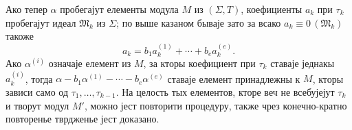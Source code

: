 ﻿\documentclass[11pt]{article}
\newcommand{\ideal}[1]{\mathfrak{#1}}
\newcommand{\eqzero}[1]{\equiv 0\,(#1)}
\begin{document}
Ако тепер \(\alpha\) пробегајут елементы модула \(M\) из \((\Sigma,T)\), коефициенты \(a_k\) при \(\tau_k\) пробегајут идеал \(\ideal M_k\) из \(\Sigma\); по выше казаном бываје зато за всако \(a_k\eqzero{\ideal M_k}\) такоже
\[
 a_k=b_1a_k^{(1)}+\cdots+b_ea_k^{(e)}.
\]
Ако \(\alpha^{(i)}\) означаје елемент из \(M\), за кторы коефициент при \(\tau_k\) ставаје једнакы \(a_k^{(i)}\), тогда \(\alpha-b_1\alpha^{(1)}-\cdots-b_e\alpha^{(e)}\) ставаје елемент принадлежны к \(M\), кторы зависи само од \(\tau_1,\ldots,\tau_{k-1}\). На целость тых елементов, кторе веч не всебујејут \(\tau_k\) и творут модул \(M'\), можно јест повторити процедуру, также чрез конечно-кратно повторенье тврдженье јест доказано.
\end{document}
